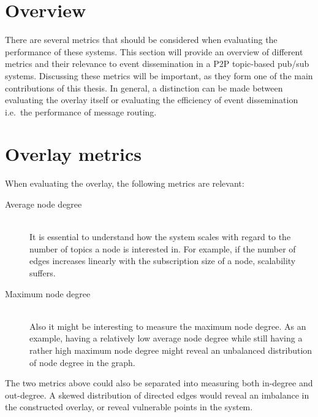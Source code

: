 \section{Overview}

     There are several metrics that should be considered when evaluating the
     performance of these systems. This section will provide an overview of
     different metrics and their relevance to event dissemination in a P2P
     topic-based pub/sub systems. Discussing these metrics will be
     important, as they form one of the main contributions of this
     thesis. In general, a distinction can be made
     between evaluating the overlay itself or evaluating the efficiency of
     event dissemination i.e.\ the performance of message routing.

\section{Overlay metrics}
    When evaluating the overlay,
    the following metrics are relevant:

    \begin{description}

    \item[Average node degree]\hfill\\
        It is essential to understand how the system scales with regard
        to the number of topics a node is interested in. For example, if the number of
        edges increases linearly with the subscription size of a node,
        scalability suffers.

    \item[Maximum node degree]\hfill\\
        Also it might be interesting to measure the maximum node
        degree. As an example, having a relatively low average node
        degree while still having a rather high maximum node degree
        might reveal an unbalanced distribution of node degree in the
        graph.

    \end{description}

    The two metrics above could also be separated into measuring both
    in-degree and out-degree. A skewed distribution of directed edges
    would reveal an imbalance in the constructed overlay, or reveal
    vulnerable points in the system.

